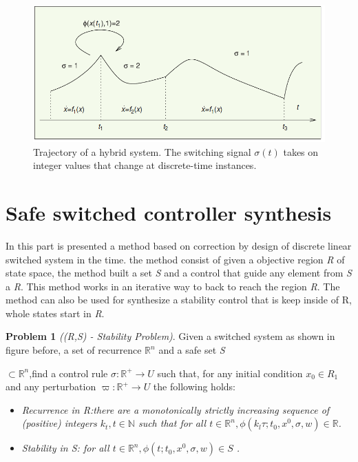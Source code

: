 \begin{figure}[!h]
    \begin{center}
        \includegraphics[width=\textwidth*4/5]{images/swiched}
        \caption{Trajectory of a hybrid system. The switching signal
        ${\sigma(t)}$ takes on integer values that change at 
        discrete-time instances.\citep{liberzon2003switching}}
    \end{center}
\end{figure}

\section{Safe switched controller synthesis}

In this part is presented a method based on correction by design of
 discrete linear switched system in the time. the method consist of 
 given a objective region \emph{R} of state space, the method built 
 a set \emph{S} and a control that guide any element from  \emph{S} 
 a \emph{R}. This method works in an iterative way to back to reach 
 the region \emph{R}. The method  can also be used for synthesize 
 a stability control that is keep inside of R, whole states start in
  \emph{R}. \cite{le2016distributed}


 \textbf{Problem 1} \emph{((R,S) - Stability Problem)}. Given a 
 switched system as shown in figure before, a set of recurrence 
 ${\mathbb{R}^n}$ and a safe set \emph{S}
 
 ${\subset \mathbb{R}^n}$,find a control rule 
 ${\sigma : \mathbb{R}^+ \rightarrow U}$ such that, for any
  initial condition ${x_0  \in  R_1}$ and any perturbation 
  ${\varpi :\mathbb{R}^+\rightarrow U}$  the
   following holds:
 
 \begin{itemize}
    \item \emph{ Recurrence in \emph{R}:there are a monotonically 
    strictly increasing sequence of (positive) integers
    ${k_t, t \in \mathbb{N}}$ such that for all ${ t \in \mathbb{R}^n,
    \phi(k_l\tau;t_0,x^0,\sigma,w) \in \mathbb{R} }$.}

    \item \emph{ Stability in \emph{S}: for all ${ t \in \mathbb{R}^n,
    \phi(t;t_0,x^0,\sigma,w) \in S}$ .}
\end{itemize}
 
